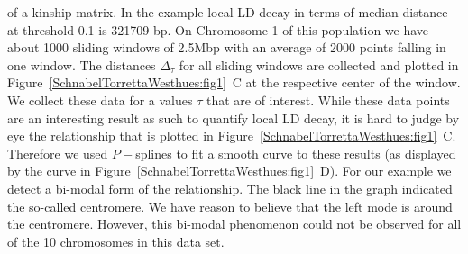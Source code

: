\documentclass[twoside]{report}
\begin{document}
	of a kinship matrix. In the example local 
		LD decay in terms of median distance at threshold 0.1 is 321709 bp. 
	On Chromosome 1 of this population we have about 1000 sliding windows
	 of 2.5Mbp with an 
	average of 2000 points falling in one window. The distances 
	$\Delta_{\tau}$ for all sliding windows are collected and plotted 
	in Figure~\ref{SchnabelTorrettaWesthues:fig1}~C 
	at the respective center of the window. We collect these data for a 
	values $\tau$ that are of interest. While these data points are an interesting result as
	such to quantify local LD decay, it is hard to judge by eye the relationship that is plotted in 
	Figure~\ref{SchnabelTorrettaWesthues:fig1}~C. Therefore we used $P-$splines to fit a smooth curve to these results (as 
	displayed by the curve in Figure~\ref{SchnabelTorrettaWesthues:fig1}~D). 
	For our example we detect a bi-modal form of the 
	relationship. The black line in the graph indicated the so-called centromere. 
	We have reason to believe that the left mode is around the centromere.   
	However, this bi-modal phenomenon could not be observed for 
	all of the 10 chromosomes in this data set.   
%
\end{document}

